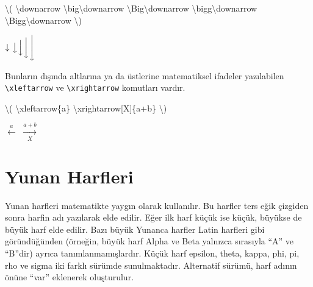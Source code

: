 \documentclass[
  10pt,
]{scrbook}
\newenvironment{Shaded}{\begin{snugshade}}{\end{snugshade}}
\newcommand{\SpecialCharTok}[1]{\textcolor[rgb]{0.00,0.00,0.00}{#1}}
\newcommand{\SpecialStringTok}[1]{\textcolor[rgb]{0.31,0.60,0.02}{#1}}
\theoremstyle{definition}
\theoremstyle{definition}
\theoremstyle{definition}
\theoremstyle{definition}
\theoremstyle{remark}
\begin{document}
\begin{Shaded}
\begin{Highlighting}[]
\SpecialStringTok{\textbackslash{}(}
\SpecialCharTok{\textbackslash{}downarrow}
\SpecialCharTok{\textbackslash{}big\textbackslash{}downarrow}
\SpecialCharTok{\textbackslash{}Big\textbackslash{}downarrow}
\SpecialCharTok{\textbackslash{}bigg\textbackslash{}downarrow}
\SpecialCharTok{\textbackslash{}Bigg\textbackslash{}downarrow}
\SpecialStringTok{\textbackslash{})}
\end{Highlighting}
\end{Shaded}

\(\downarrow \big\downarrow \Big\downarrow \bigg\downarrow \Bigg\downarrow\)

Bunların dışında altlarına ya da üstlerine matematiksel ifadeler yazılabilen \texttt{\textbackslash{}xleftarrow} ve \texttt{\textbackslash{}xrightarrow} komutları vardır.

\begin{Shaded}
\begin{Highlighting}[]
\SpecialStringTok{\textbackslash{}(}
\SpecialCharTok{\textbackslash{}xleftarrow}\SpecialStringTok{\{a\}}
\SpecialCharTok{\textbackslash{}xrightarrow}\SpecialStringTok{[X]\{a+b\}}
\SpecialStringTok{\textbackslash{})}
\end{Highlighting}
\end{Shaded}

\(\xleftarrow{a}\) \(\xrightarrow[X]{a+b}\)

\hypertarget{yunan-harfleri}{%
\section{Yunan Harfleri}\label{yunan-harfleri}}

Yunan harfleri matematikte yaygın olarak kullanılır. Bu harfler ters eğik çizgiden sonra harfin adı yazılarak elde edilir. Eğer ilk harf küçük ise küçük, büyükse de büyük harf elde edilir. Bazı büyük Yunanca harfler Latin harfleri gibi göründüğünden (örneğin, büyük harf Alpha ve Beta yalnızca sırasıyla ``A'' ve ``B''dir) ayrıca tanımlanmamışlardır. Küçük harf epsilon, theta, kappa, phi, pi, rho ve sigma iki farklı sürümde sunulmaktadır. Alternatif sürümü, harf adının önüne ``var'' eklenerek oluşturulur.
\end{document}
